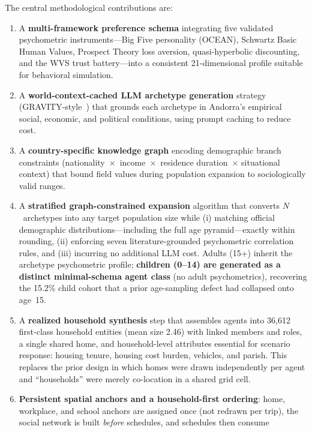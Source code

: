 \documentclass[a4paper,12pt]{article}
\begin{document}
The central methodological contributions are:

\begin{enumerate}
\item A \textbf{multi-framework preference schema} integrating five validated
      psychometric instruments---Big Five personality (OCEAN), Schwartz Basic
      Human Values, Prospect Theory loss aversion, quasi-hyperbolic discounting,
      and the WVS trust battery---into a consistent 21-dimensional profile
      suitable for behavioral simulation.
\item A \textbf{world-context-cached LLM archetype generation} strategy
      (GRAVITY-style~\cite{gravity2025}) that grounds each archetype in
      Andorra's empirical social, economic, and political conditions, using
      prompt caching to reduce cost.
\item A \textbf{country-specific knowledge graph} encoding demographic branch
      constraints (nationality~$\times$~income~$\times$~residence duration~$\times$
      situational context) that bound field values during population expansion
      to sociologically valid ranges.
\item A \textbf{stratified graph-constrained expansion} algorithm that converts
      $N$~archetypes into any target population size while (i) matching official
      demographic distributions---including the full age pyramid---exactly within
      rounding, (ii) enforcing seven literature-grounded psychometric correlation
      rules, and (iii) incurring no additional LLM cost. Adults (15+) inherit the
      archetype psychometric profile; \textbf{children (0--14) are generated as a
      distinct minimal-schema agent class} (no adult psychometrics), recovering the
      15.2\% child cohort that a prior age-sampling defect had collapsed onto age~15.
\item A \textbf{realized household synthesis} step that assembles agents into
      36{,}612 first-class household entities (mean size 2.46) with linked members
      and roles, a single shared home, and household-level attributes essential for
      scenario response: housing tenure, housing cost burden, vehicles, and parish.
      This replaces the prior design in which homes were drawn independently per
      agent and ``households'' were merely co-location in a shared grid cell.
\item \textbf{Persistent spatial anchors and a household-first ordering}: home,
      workplace, and school anchors are assigned once (not redrawn per trip), the
      social network is built \emph{before} schedules, and schedules then consume

\end{enumerate}
\end{document}
